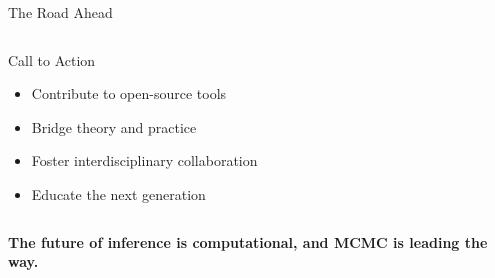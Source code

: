 \documentclass[aspectratio=169,11pt]{beamer}
\begin{document}
\begin{frame}{The Road Ahead}
\begin{columns}
\begin{column}{0.4\textwidth}
\vspace{0.3cm}
\begin{block}{Call to Action}
\begin{itemize}
\item Contribute to open-source tools
\item Bridge theory and practice
\item Foster interdisciplinary collaboration
\item Educate the next generation
\end{itemize}
\end{block}
\end{column}
\end{columns}

\vspace{0.3cm}
\begin{center}
\textcolor{navyblue}{\Large \textbf{The future of inference is computational, and MCMC is leading the way.}}
\end{center}
\end{frame}
\end{document}
